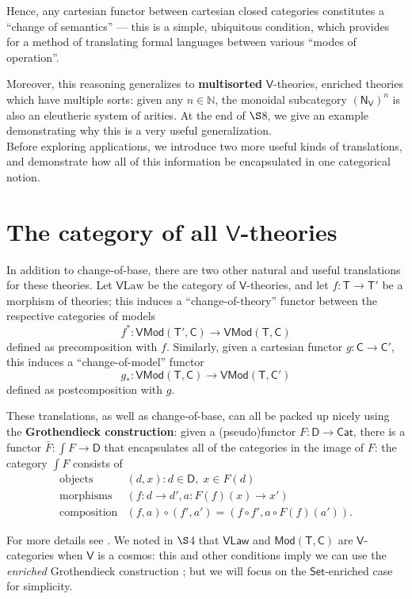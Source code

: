 \documentclass{amsart}
\theoremstyle{definition}
\newcommand{\Set}{\mathsf{Set}}
\newcommand{\Cat}{\mathsf{Cat}}
\newcommand{\Law}{\mathsf{Law}}
\newcommand{\Mod}{\mathsf{Mod}}
\newcommand{\NN}{\mathsf{N}}
\newcommand{\V}{\mathsf{V}}
\newcommand{\D}{\mathsf{D}}
\newcommand{\C}{\mathsf{C}}
\newcommand{\T}{\mathsf{T}}
\newcommand{\maps}{\colon}
\begin{document}
Hence, any cartesian functor between cartesian closed categories constitutes a ``change of semantics'' --- this is a simple, ubiquitous condition, which provides for a method of translating formal languages between various ``modes of operation''.

Moreover, this reasoning generalizes to \textbf{multisorted} $\V$-theories, enriched theories which have multiple sorts: given any $n\in \mathbb{N}$, the monoidal subcategory $(\NN_\V)^n$ is also an eleutheric system of arities. At the end of $\S$8, we give an example demonstrating why this is a very useful generalization.\\

Before exploring applications, we introduce two more useful kinds of translations, and demonstrate how all of this information be encapsulated in one categorical notion.

\section{The category of all $\V$-theories}

In addition to change-of-base, there are two other natural and useful translations for these theories. Let $\V\mathrm{Law}$ be the category of $\V$-theories, and let $f\maps\T\to \T'$ be a morphism of theories; this induces a ``change-of-theory'' functor between the respective categories of models $$f^*\maps\V\Mod(\T',\C)\to \V\Mod(\T,\C)$$ defined as precomposition with $f$. Similarly, given a cartesian functor $g\maps \C \to \C'$, this induces a ``change-of-model'' functor $$g_*\maps\V\Mod(\T,\C) \to \V\Mod(\T,\C')$$ defined as postcomposition with $g$.

These translations, as well as change-of-base, can all be packed up nicely using the \textbf{Grothendieck construction}: given a (pseudo)functor $F\maps \D \to \Cat$, there is a functor $\bar{F}\maps \int F \to \D$ that encapsulates all of the categories in the image of $F$: the category $\int F$ consists of
\[\begin{array}{rl}
\text{objects} & (d,x) \colon d\in \D, \; x\in F(d)\\
\text{morphisms} & (f\maps d\to d',a\maps F(f)(x)\to x')\\
\text{composition} & (f,a) \circ (f',a') = (f \circ f', a \circ F(f)(a')).
\end{array}\]

For more details see \cite{borceux,jacobs}.  We noted in $\S$4 that $\V\Law$ and $\Mod(\T,\C)$ are $\V$-categories when $\V$ is a cosmos: this and other conditions imply we can use the \textit{enriched} Grothendieck construction \cite{beardsleywong}; but we will focus on the $\Set$-enriched case for simplicity. 
\end{document}
